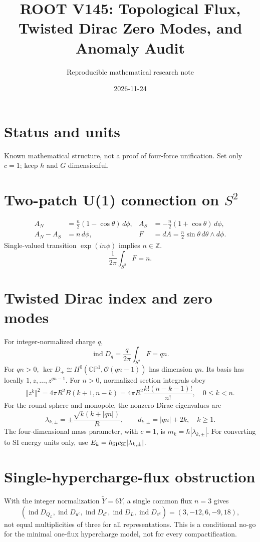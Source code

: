 \documentclass[11pt]{article}
\title{ROOT V145: Topological Flux, Twisted Dirac Zero Modes, and Anomaly Audit}
\author{Reproducible mathematical research note}
\date{2026-11-24}
\begin{document}
\maketitle
\section{Status and units}
Known mathematical structure, not a proof of four-force unification.
Set only $c=1$; keep $\hbar$ and $G$ dimensionful.
\section{Two-patch U(1) connection on $S^2$}
\begin{align}
 A_N&=\frac n2(1-\cos\theta)\,d\phi,&
 A_S&=-\frac n2(1+\cos\theta)\,d\phi,\\
 A_N-A_S&=n\,d\phi,&
 F&=dA=\frac n2\sin\theta\,d\theta\wedge d\phi.
\end{align}
Single-valued transition $\exp(in\phi)$ implies $n\in\mathbb Z$.
\begin{equation} \frac1{2\pi}\int_{S^2}F=n. \end{equation}
\section{Twisted Dirac index and zero modes}
For integer-normalized charge $q$,
\begin{equation} \operatorname{ind}D_q=\frac q{2\pi}\int_{S^2}F=qn.\end{equation}
For $qn>0$, $\ker D_+\cong H^0(\mathbb{CP}^1,\mathcal O(qn-1))$ has dimension $qn$.
Its basis has locally $1,z,\ldots,z^{qn-1}$.
For $n>0$, normalized section integrals obey
\begin{equation}
\Vert z^k\Vert^2=4\pi R^2 B(k+1,n-k)
=4\pi R^2\frac{k!(n-k-1)!}{n!},\quad 0\le k<n.
\end{equation}
For the round sphere and monopole, the nonzero Dirac eigenvalues are
\begin{equation}
\lambda_{k,\pm}=\pm\frac{\sqrt{k(k+|qn|)}}R,
\qquad d_{k,\pm}=|qn|+2k,\quad k\ge1.
\end{equation}
The four-dimensional mass parameter, with $c=1$, is $m_k=\hbar|\lambda_{k,\pm}|$.
For converting to SI energy units only, use $E_k=\hbar_{\rm SI}c_{\rm SI}|\lambda_{k,\pm}|$.
\section{Single-hypercharge-flux obstruction}
With the integer normalization $\widetilde Y=6Y$, a single common flux $n=3$ gives
\begin{equation}
(\operatorname{ind}D_{Q_L},\operatorname{ind}D_{u^c},\operatorname{ind}D_{d^c},
\operatorname{ind}D_L,\operatorname{ind}D_{e^c})=(3,-12,6,-9,18),
\end{equation}
not equal multiplicities of three for all representations. This is a conditional
no-go for the minimal one-flux hypercharge model, not for every compactification.
\end{document}
